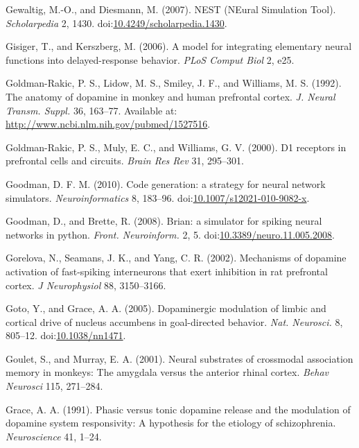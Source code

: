 \documentclass[
  11pt,
  a4paper,
]{scrbook}
\newlength{\cslhangindent}
\newenvironment{CSLReferences}[2] %
 {\begin{list}{}{%
  \setlength{\itemindent}{0pt}
  \setlength{\leftmargin}{0pt}
  \setlength{\parsep}{0pt}
  \ifodd #1
   \setlength{\leftmargin}{\cslhangindent}
   \setlength{\itemindent}{-1\cslhangindent}
  \fi
  \setlength{\itemsep}{#2\baselineskip}}}
 {\end{list}}
\begin{document}
\begin{CSLReferences}{1}{1}
Gewaltig, M.-O., and Diesmann, M. (2007). {NEST (NEural Simulation
Tool)}. \emph{Scholarpedia} 2, 1430.
doi:\href{https://doi.org/10.4249/scholarpedia.1430}{10.4249/scholarpedia.1430}.

Gisiger, T., and Kerszberg, M. (2006). A model for integrating
elementary neural functions into delayed-response behavior. \emph{PLoS
Comput Biol} 2, e25.

Goldman-Rakic, P. S., Lidow, M. S., Smiley, J. F., and Williams, M. S.
(1992). {The anatomy of dopamine in monkey and human prefrontal cortex.}
\emph{J. Neural Transm. Suppl.} 36, 163--77. Available at:
\url{http://www.ncbi.nlm.nih.gov/pubmed/1527516}.

Goldman-Rakic, P. S., Muly, E. C., and Williams, G. V. (2000). D1
receptors in prefrontal cells and circuits. \emph{Brain Res Rev} 31,
295--301.

Goodman, D. F. M. (2010). {Code generation: a strategy for neural
network simulators.} \emph{Neuroinformatics} 8, 183--96.
doi:\href{https://doi.org/10.1007/s12021-010-9082-x}{10.1007/s12021-010-9082-x}.

Goodman, D., and Brette, R. (2008). {Brian: a simulator for spiking
neural networks in python.} \emph{Front. Neuroinform.} 2, 5.
doi:\href{https://doi.org/10.3389/neuro.11.005.2008}{10.3389/neuro.11.005.2008}.

Gorelova, N., Seamans, J. K., and Yang, C. R. (2002). Mechanisms of
dopamine activation of fast-spiking interneurons that exert inhibition
in rat prefrontal cortex. \emph{J Neurophysiol} 88, 3150--3166.

Goto, Y., and Grace, A. A. (2005). {Dopaminergic modulation of limbic
and cortical drive of nucleus accumbens in goal-directed behavior.}
\emph{Nat. Neurosci.} 8, 805--12.
doi:\href{https://doi.org/10.1038/nn1471}{10.1038/nn1471}.

Goulet, S., and Murray, E. A. (2001). Neural substrates of crossmodal
association memory in monkeys: The amygdala versus the anterior rhinal
cortex. \emph{Behav Neurosci} 115, 271--284.

Grace, A. A. (1991). Phasic versus tonic dopamine release and the
modulation of dopamine system responsivity: A hypothesis for the
etiology of schizophrenia. \emph{Neuroscience} 41, 1--24.


\end{CSLReferences}
\end{document}
